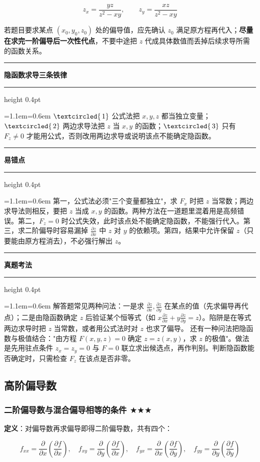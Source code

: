 \documentclass[11pt,openany,UTF8]{ctexbook}
\newcommand{\circled}[1]{\textcircled{\scriptsize\,#1}}
\newcommand{\callouthead}[2]{%
  \par\addvspace{7pt}\noindent
  {\color{#1}\rule[-0.15em]{3pt}{1.05em}}\hspace{0.5em}%
  {\bfseries\color{#1}#2}\par\nobreak\vspace{-0.35em}%
  {\color{rulesep}\hrule height 0.4pt}\nobreak\vspace{0.45em}%
  \begingroup\small\setlength{\parindent}{0pt}%
  \leftskip=1.1em\rightskip=0.6em\noindent\ignorespaces}
\newcommand{\calloutend}{\par\endgroup\addvspace{7pt}}
\newenvironment{callkey}[1]{\callouthead{keybar}{#1}}{\calloutend}
\newenvironment{callwarn}[1]{\callouthead{warnbar}{#1}}{\calloutend}
\newenvironment{callexam}[1]{\callouthead{exambar}{#1}}{\calloutend}
\begin{document}
\[z_x=\frac{yz}{z^{2}-xy},\qquad z_y=\frac{xz}{z^{2}-xy}\]

若题目要求某点 $(x_0,y_0,z_0)$ 处的偏导值，应先确认 $z_0$ 满足原方程再代入；\textbf{尽量在求完一阶偏导后一次性代点}，不要中途把 $z$ 代成具体数值而丢掉后续求导所需的函数关系。

\begin{callkey}{隐函数求导三条铁律}
$\circled{1}$ 公式法把 $x,y,z$ 都当独立变量；$\circled{2}$ 两边求导法把 $z$ 当 $x,y$ 的函数；$\circled{3}$ 只有 $F_z\ne 0$ 才能用公式，否则改用两边求导或说明该点不能确定隐函数。

\end{callkey}

\begin{callwarn}{易错点}
第一，公式法必须"三个变量都独立"，求 $F_x$ 时把 $z$ 当常数；两边求导法则相反，要把 $z$ 当成 $x,y$ 的函数。两种方法在一道题里混着用是高频错误。第二，$F_z=0$ 时公式失效，此时该点处不能确定隐函数，不能强行代入。第三，求二阶偏导时容易漏掉 $\frac{\partial z}{\partial x}$ 中 $z$ 对 $y$ 的依赖项。第四，结果中允许保留 $z$（只要能由原方程消去），不必强行解出 $z$。

\end{callwarn}

\begin{callexam}{真题考法}
解答题常见两种问法：一是求 $\frac{\partial z}{\partial x},\frac{\partial z}{\partial y}$ 在某点的值（先求偏导再代点）；二是由隐函数确定 $z$ 后验证某个恒等式（如 $x\frac{\partial z}{\partial x}+y\frac{\partial z}{\partial y}=z$）。陷阱是在等式两边求导时把 $z$ 当常数，或者用公式法时对 $z$ 也求了偏导。 还有一种问法把隐函数与极值结合："由方程 $F(x,y,z)=0$ 确定 $z=z(x,y)$，求 $z$ 的极值"。做法是先用驻点条件 $z_x=z_y=0$ 与 $F=0$ 联立求出候选点，再作判别。判断隐函数能否确定时，只需检查 $F_z$ 在该点是否非零。

\end{callexam}

\subsection{高阶偏导数}

\subsubsection{二阶偏导数与混合偏导相等的条件 $\bigstar$$\bigstar$$\bigstar$}

\textbf{定义}：对偏导数再求偏导即得二阶偏导数，共有四个：

\[f_{xx}=\frac{\partial}{\partial x}\left(\frac{\partial f}{\partial x}\right),\quad f_{xy}=\frac{\partial}{\partial y}\left(\frac{\partial f}{\partial x}\right),\quad f_{yx}=\frac{\partial}{\partial x}\left(\frac{\partial f}{\partial y}\right),\quad f_{yy}=\frac{\partial}{\partial y}\left(\frac{\partial f}{\partial y}\right)\]
\end{document}
